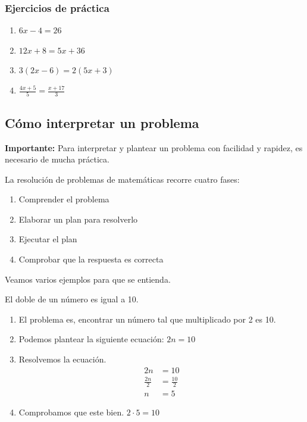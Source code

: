 \documentclass{article}
\begin{document}
\subsubsection*{Ejercicios de práctica}
\begin{small}
\begin{enumerate}
	\item $6x-4=26$
	\item $12x+8=5x+36$
	\item $3(2x-6)=2(5x+3)$
	\item $\frac{4x+5}{5}=\frac{x+17}{3}$
\end{enumerate}
\end{small}

\subsection{Cómo interpretar un problema}
\begin{small}
\textbf{Importante:} Para interpretar y plantear un problema con facilidad y rapidez, es necesario de mucha práctica.

La resolución de problemas de matemáticas recorre cuatro fases:
\begin{enumerate}
	\item Comprender el problema
	\item Elaborar un plan para resolverlo
	\item Ejecutar el plan
	\item Comprobar que la respuesta es correcta
\end{enumerate}

Veamos varios ejemplos para que se entienda.
\\
\end{small}

\begin{ejemplo}
El doble de un número es igual a 10.

\begin{enumerate}
	\item El problema es, encontrar un número tal que multiplicado por 2 es 10.
	\item Podemos plantear la siguiente ecuación: $2n=10$
	\item Resolvemos la ecuación.
		\begin{align}
		2n&=10\nonumber\\
		\frac{2n}{2}&=\frac{10}{2}\nonumber\\
		n&=5\nonumber
		\end{align}
	\item Comprobamos que este bien. $2\cdot5=10$
\end{enumerate}

\end{ejemplo}
\end{document}
